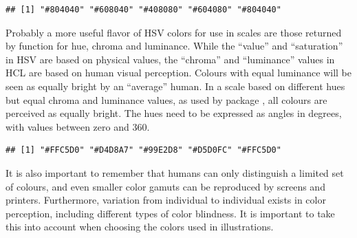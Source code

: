 \documentclass[krantz2]{krantz}\usepackage{knitr}
\begin{document}
\begin{knitrout}\footnotesize
{}\color{fgcolor}\begin{kframe}
\begin{alltt}
\hlstd{(}\hlstd{(}\hlstd{,}\hlstd{,}\hlstd{,}\hlstd{,}\hlstd{),} \hlstd{,} \hlstd{)}
\end{alltt}
\begin{verbatim}
## [1] "#804040" "#608040" "#408080" "#604080" "#804040"
\end{verbatim}
\end{kframe}
\end{knitrout}

Probably a more useful flavor of HSV colors for use in scales are those returned by function  for hue, chroma and luminance. While the ``value'' and ``saturation'' in HSV are based on physical values, the ``chroma'' and ``luminance'' values in HCL are based on human visual perception. Colours with equal luminance will be seen as equally bright by an ``average'' human. In a scale based on different hues but equal chroma and luminance values, as used by package \ggplot, all colours are perceived as equally bright. The hues need to be expressed as angles in degrees, with values between zero and 360.

\begin{knitrout}\footnotesize
{}\color{fgcolor}\begin{kframe}
\begin{alltt}
\hlstd{(}\hlstd{(}\hlstd{,}\hlstd{,}\hlstd{,}\hlstd{,}\hlstd{)} \hlopt{*} \hlstd{)}
\end{alltt}
\begin{verbatim}
## [1] "#FFC5D0" "#D4D8A7" "#99E2D8" "#D5D0FC" "#FFC5D0"
\end{verbatim}
\end{kframe}
\end{knitrout}

It is also important to remember that humans can only distinguish a limited set of colours, and even smaller color gamuts can be reproduced by screens and printers. Furthermore, variation from individual to individual exists in color perception, including different types of color blindness. It is important to take this into account when choosing the colors used in illustrations.
\end{document}
